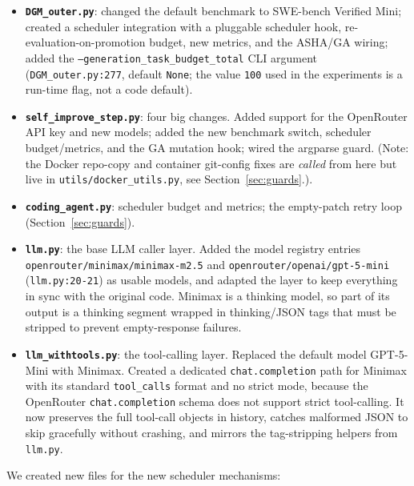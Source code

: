 \begin{itemize}
  \item \textbf{\texttt{DGM\_outer.py}}: changed the default benchmark to
    SWE-bench Verified Mini; created a scheduler integration with a
    pluggable scheduler hook, re-evaluation-on-promotion budget, new
    metrics, and the ASHA/GA wiring; added the
    \texttt{--generation\_task\_budget\_total} CLI argument
    (\texttt{DGM\_outer.py:277}, default \texttt{None}; the value
    \texttt{100} used in the experiments is a run-time flag, not a code
    default).
  \item \textbf{\texttt{self\_improve\_step.py}}: four big changes. Added
    support for the OpenRouter API key and new models; added the new
    benchmark switch, scheduler budget/metrics, and the GA mutation hook;
    wired the argparse guard. (Note: the Docker repo-copy and container
    git-config fixes are \emph{called} from here but live in
    \texttt{utils/docker\_utils.py}, see Section~\ref{sec:guards}.).
  \item \textbf{\texttt{coding\_agent.py}}: scheduler budget and metrics;
    the empty-patch retry loop (Section~\ref{sec:guards}).
  \item \textbf{\texttt{llm.py}}: the base LLM caller layer. Added the
    model registry entries \texttt{openrouter/minimax/minimax-m2.5} and
    \texttt{openrouter/openai/gpt-5-mini} (\texttt{llm.py:20-21}) as
    usable models, and adapted the layer to keep everything in sync with
    the original code. Minimax is a thinking model, so part of its output
    is a thinking segment wrapped in thinking/JSON tags that must be
    stripped to prevent empty-response failures.
  \item \textbf{\texttt{llm\_withtools.py}}: the tool-calling layer.
    Replaced the default model GPT-5-Mini with Minimax. Created a
    dedicated \texttt{chat.completion} path for Minimax with its standard
    \texttt{tool\_calls} format and no strict mode, because the OpenRouter
    \texttt{chat.completion} schema does not support strict tool-calling.
    It now preserves the full tool-call objects in history, catches
    malformed JSON to skip gracefully without crashing, and mirrors the
    tag-stripping helpers from \texttt{llm.py}.
\end{itemize}

We created new files for the new scheduler mechanisms:


